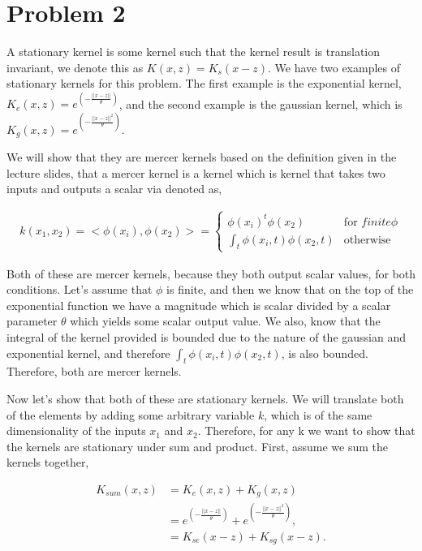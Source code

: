\documentclass[paper=a4, fontsize=11pt]{scrartcl} %
\begin{document}
\section{Problem 2}

A stationary kernel is some kernel such that the kernel result is translation invariant, we denote this as $K(x,z) = K_s(x-z)$.  We have two examples of stationary kernels for this problem.  The first example is the exponential kernel, $K_e(x,z) = e^{(-\frac{||x-z||}{\theta})}$, and the second example is the gaussian kernel, which is $K_g(x,z) = e^{(-\frac{||x-z||^2}{\theta})}$.

We will show that they are mercer kernels based on the definition given in the lecture slides, that a mercer kernel is a kernel which is kernel that takes two inputs and outputs a scalar via denoted as,

\begin{align}
k(x_1,x_2) = <\phi(x_i),\phi(x_2)> = \left\{
	\begin{array}{ll}
		\phi(x_i)^t\phi(x_2) & \mbox{for } finite \phi \\
		\int_t \phi(x_i,t)\phi(x_2,t) & \mbox{otherwise} 
	\end{array}
\right.
\end{align} 

Both of these are mercer kernels, because they both output scalar values, for both conditions.
Let's assume that $\phi$ is finite, and then we know that on the top of the exponential function we have a magnitude which is scalar divided by a scalar parameter $\theta$ which yields some scalar output value.
We also, know that the integral of the kernel provided is bounded due to the nature of the gaussian and exponential kernel, and therefore $\int_t \phi(x_i,t)\phi(x_2,t)$, is also bounded.  Therefore, both are mercer kernels.

Now let's show that both of these are stationary kernels.  We will translate both of the elements by adding some arbitrary variable $k$, which is of the same dimensionality of the inputs $x_1$ and $x_2$.  Therefore, for any k we want to show that the kernels are stationary under sum and product.  First, assume we sum the kernels together,

\begin{align}
K_{sum}(x,z) &= K_e(x,z)+K_g(x,z) \\
&= e^{(-\frac{||x-z||}{\theta})} + e^{(-\frac{||x-z||^2}{\theta})}, \\
&= K_{se}(x-z) + K_{sg}(x-z). \\
\end{align}
\end{document}
